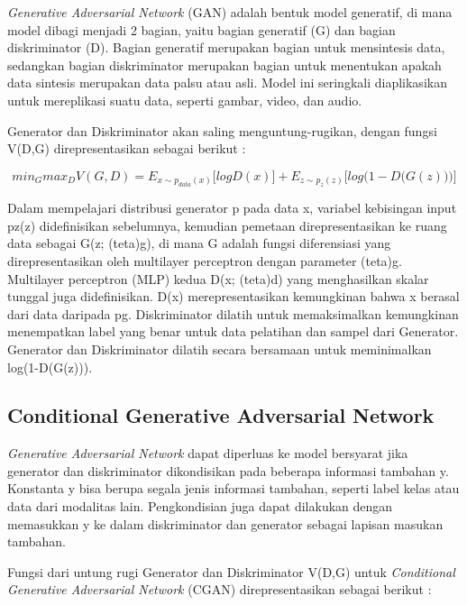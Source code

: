 \emph{Generative Adversarial Network} (GAN) adalah bentuk model generatif, di mana model dibagi menjadi 2 bagian, yaitu bagian generatif (G) dan bagian diskriminator (D). 
Bagian generatif merupakan bagian untuk mensintesis data, sedangkan bagian diskriminator merupakan bagian untuk menentukan apakah data sintesis merupakan data palsu atau asli. 
Model ini seringkali diaplikasikan untuk mereplikasi suatu data, seperti gambar, video, dan audio.

Generator dan Diskriminator akan saling menguntung-rugikan, dengan fungsi V(D,G) direpresentasikan sebagai berikut : 

\begin{equation}
  \label{eq:GAN}
  min_{G} max_{D} V(G,D) =  E_{x \sim p_{data} (x)} \big[ log D(x) \big] + E_{z \sim p_{z} (z)} \big[ log  \big(1-D \big(G(z)\big) \big) \big]
\end{equation}

Dalam mempelajari distribusi generator p pada data x, variabel kebisingan input pz(z) didefinisikan sebelumnya, kemudian pemetaan direpresentasikan ke ruang data sebagai G(z; (teta)g), di mana G adalah fungsi diferensiasi yang direpresentasikan oleh multilayer perceptron dengan parameter (teta)g. 
Multilayer perceptron (MLP) kedua D(x; (teta)d) yang menghasilkan skalar tunggal juga didefinisikan. 
D(x) merepresentasikan kemungkinan bahwa x berasal dari data daripada pg. 
Diskriminator dilatih untuk memaksimalkan kemungkinan menempatkan label yang benar untuk data pelatihan dan sampel dari Generator. 
Generator dan  Diskriminator dilatih secara bersamaan untuk meminimalkan log(1-D(G(z))). \parencite{GAN}

\subsection{Conditional Generative Adversarial Network}
\label{subsec:conditionalGAN}

\emph{Generative Adversarial Network} dapat diperluas ke model bersyarat jika generator dan diskriminator dikondisikan pada beberapa informasi tambahan y. 
Konstanta y bisa berupa segala jenis informasi tambahan, seperti label kelas atau data dari modalitas lain. 
Pengkondisian juga dapat dilakukan dengan memasukkan y ke dalam diskriminator dan generator sebagai lapisan masukan tambahan.

Fungsi dari untung rugi Generator dan Diskriminator V(D,G) untuk \emph{Conditional Generative Adversarial Network} (CGAN) direpresentasikan sebagai berikut :

